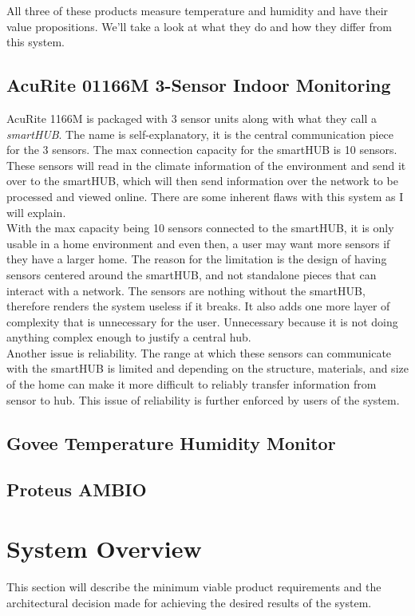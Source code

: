 \documentclass{article}
\begin{document}
All three of these products measure temperature and humidity and have their value propositions. We'll take a look at what they do and how they differ from this system.

\subsection{AcuRite 01166M 3-Sensor Indoor Monitoring}
AcuRite 1166M is packaged with 3 sensor units along with what they call a \textit{smartHUB}. The name is self-explanatory, it is the central communication piece for the 3 sensors. The max connection capacity for the smartHUB is 10 sensors. These sensors will read in the climate information of the environment and send it over to the smartHUB, which will then send information over the network to be processed and viewed online. There are some inherent flaws with this system as I will explain.\\

With the max capacity being 10 sensors connected to the smartHUB, it is only usable in a home environment and even then, a user may want more sensors if they have a larger home. The reason for the limitation is the design of having sensors centered around the smartHUB, and not standalone pieces that can interact with a network. The sensors are nothing without the smartHUB, therefore renders the system useless if it breaks. It also adds one more layer of complexity that is unnecessary for the user. Unnecessary because it is not doing anything complex enough to justify a central hub.\\

Another issue is reliability. The range at which these sensors can communicate with the smartHUB is limited and depending on the structure, materials, and size of the home can make it more difficult to reliably transfer information from sensor to hub. This issue of reliability is further enforced by users of the system.

\subsection{Govee Temperature Humidity Monitor}
\subsection{Proteus AMBIO}

\section{System Overview}
\label{section:overview}
This section will describe the minimum viable product requirements and the architectural decision made for achieving the desired results of the system.
\end{document}
